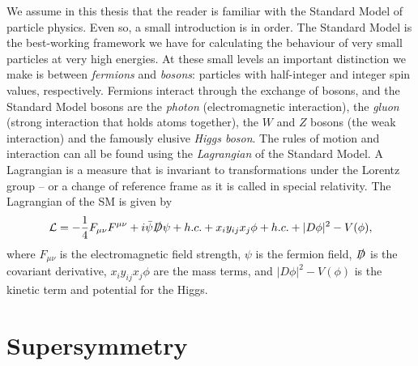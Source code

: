 \documentclass[twoside,english]{uiofysmaster}
\begin{document}
We assume in this thesis that the reader is familiar with the Standard Model of particle physics. Even so, a small introduction is in order. The Standard Model is the best-working framework we have for calculating the behaviour of very small particles at very high energies. At these small levels an important distinction we make is between \textit{fermions} and \textit{bosons}: particles with half-integer and integer spin values, respectively. Fermions interact through the exchange of bosons, and the Standard Model bosons are the \textit{photon} (electromagnetic interaction), the \textit{gluon} (strong interaction that holds atoms together), the $W$ and $Z$ bosons (the weak interaction) and the famously elusive \textit{Higgs boson}. The rules of motion and interaction can all be found using the \textit{Lagrangian} of the Standard Model. A Lagrangian is a measure that is invariant to transformations under the Lorentz group -- or a change of reference frame as it is called in special relativity. The Lagrangian of the SM is given by
\begin{align}
\mathcal{L} = - \frac{1}{4} F_{\mu \nu} F^{\mu \nu} + i \bar{\psi} \slashed{D} \psi + h.c. + x_i y_{ij} x_j \phi + h.c. + |D \phi|^2 - V(\phi),
\end{align}
where $F_{\mu \nu}$ is the electromagnetic field strength, $\psi$ is the fermion field, $\slashed{D}$ is the covariant derivative, $x_iy_{ij}x_j \phi$ are the mass terms, and $|D \phi|^2 - V(\phi)$ is the kinetic term and potential for the Higgs. 




\section{Supersymmetry}
\end{document}
